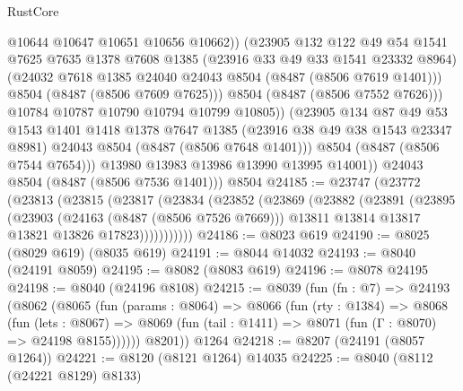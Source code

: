 \begin{lexlean}{RustCore}
\begin{coremodule}
                      @10644
                      @10647
                      @10651
                      @10656
                      @10662))
                  (@23905
                    @132
                    @122
                    @49
                    @54
                    @1541
                    @7625
                    @7635
                    @1378
                    @7608
                    @1385
                    (@23916 @33 @49 @33 @1541 @23332 @8964)
                    (@24032 @7618 @1385 @24040 @24043 @8504 (@8487 (@8506 @7619 @1401)))
                    @8504
                    (@8487 (@8506 @7609 @7625)))
                  @8504
                  (@8487 (@8506 @7552 @7626)))
                @10784
                @10787
                @10790
                @10794
                @10799
                @10805))
            (@23905
              @134
              @87
              @49
              @53
              @1543
              @1401
              @1418
              @1378
              @7647
              @1385
              (@23916 @38 @49 @38 @1543 @23347 @8981)
              @24043
              @8504
              (@8487 (@8506 @7648 @1401)))
            @8504
            (@8487 (@8506 @7544 @7654)))
          @13980
          @13983
          @13986
          @13990
          @13995
          @14001))
      @24043
      @8504
      (@8487 (@8506 @7536 @1401)))
    @8504
@24185 := @23747
    (@23772
      (@23813
        (@23815
          (@23817
            (@23834
              (@23852
                (@23869
                  (@23882
                    (@23891
                      (@23895
                        (@23903
                          (@24163 (@8487 (@8506 @7526 @7669)))
                          @13811
                          @13814
                          @13817
                          @13821
                          @13826
                          @17823)))))))))))
@24186 := @8023 @619
@24190 := @8025 (@8029 @619) (@8035 @619)
@24191 := @8044 @14032
@24193 := @8040 (@24191 @8059)
@24195 := @8082 (@8083 @619)
@24196 := @8078 @24195
@24198 := @8040 (@24196 @8108)
@24215 := @8039
    (fun (fn : @7) =>
    @24193
      (@8062
        (@8065
          (fun (params : @8064) =>
          @8066
            (fun (rty : @1384) =>
            @8068
              (fun (lets : @8067) =>
              @8069 (fun (tail : @1411) => @8071 (fun (Γ : @8070) => @24198 @8155))))))
        @8201))
    @1264
@24218 := @8207 (@24191 (@8057 @1264))
@24221 := @8120 (@8121 @1264) @14035
@24225 := @8040 (@8112 (@24221 @8129) @8133)

\end{coremodule}
\end{lexlean}
